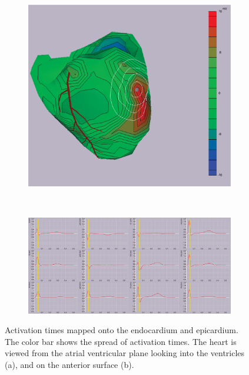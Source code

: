 \documentclass[12pt]{article}
\begin{document}
\begin{figure}[H]
	\begin{subfigure}{.75\textwidth}
		\centering
		\includegraphics[width=.95\linewidth]{Figures/1_3_pot_2.png}
		\caption{}
		
	\end{subfigure}%
\\
	\begin{subfigure}{.95\textwidth}
		\centering
		\includegraphics[width=.95\linewidth]{Figures/1_3_ecg_2.png}
		\caption{}
		
	\end{subfigure}
	\caption{Activation times mapped onto the endocardium and epicardium. The color bar shows the spread of activation times. The heart is viewed from the atrial ventricular plane looking into the ventricles (a), and on the anterior surface (b).}
	\label{1_3_2}
\end{figure}
\end{document}
